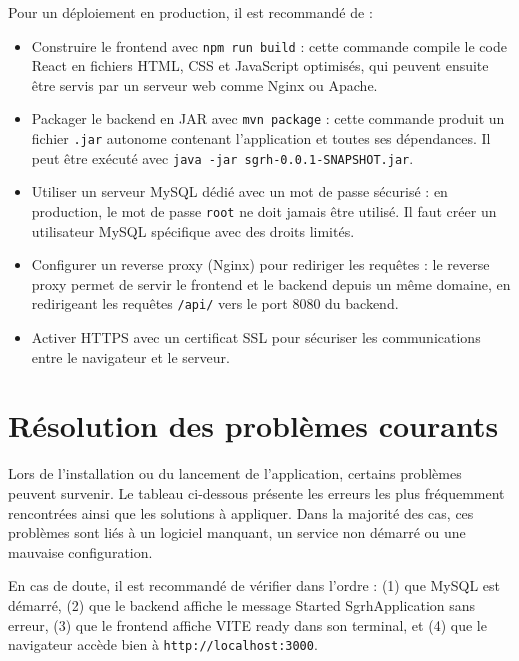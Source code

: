 \documentclass[12pt,a4paper]{report}
\begin{document}
Pour un déploiement en production, il est recommandé de :
\begin{itemize}
    \item Construire le frontend avec \texttt{npm run build} : cette commande compile le code React en fichiers HTML, CSS et JavaScript optimisés, qui peuvent ensuite être servis par un serveur web comme Nginx ou Apache.
    \item Packager le backend en JAR avec \texttt{mvn package} : cette commande produit un fichier \texttt{.jar} autonome contenant l'application et toutes ses dépendances. Il peut être exécuté avec \texttt{java -jar sgrh-0.0.1-SNAPSHOT.jar}.
    \item Utiliser un serveur MySQL dédié avec un mot de passe sécurisé : en production, le mot de passe \texttt{root} ne doit jamais être utilisé. Il faut créer un utilisateur MySQL spécifique avec des droits limités.
    \item Configurer un reverse proxy (Nginx) pour rediriger les requêtes : le reverse proxy permet de servir le frontend et le backend depuis un même domaine, en redirigeant les requêtes \texttt{/api/} vers le port 8080 du backend.
    \item Activer HTTPS avec un certificat SSL pour sécuriser les communications entre le navigateur et le serveur.
\end{itemize}

\chapter{Résolution des problèmes courants}

Lors de l'installation ou du lancement de l'application, certains problèmes peuvent survenir. Le tableau ci-dessous présente les erreurs les plus fréquemment rencontrées ainsi que les solutions à appliquer. Dans la majorité des cas, ces problèmes sont liés à un logiciel manquant, un service non démarré ou une mauvaise configuration.

En cas de doute, il est recommandé de vérifier dans l'ordre : (1) que MySQL est démarré, (2) que le backend affiche le message \og Started SgrhApplication \fg{} sans erreur, (3) que le frontend affiche \og VITE ready \fg{} dans son terminal, et (4) que le navigateur accède bien à \texttt{http://localhost:3000}.
\end{document}
